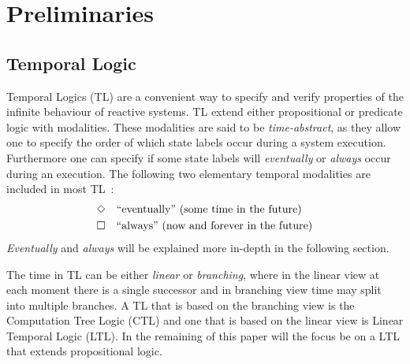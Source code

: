 \section{Preliminaries}\label{sec:preliminaries}

\subsection{Temporal Logic}
Temporal Logics (TL) are a convenient way to specify and verify properties of the infinite behaviour of reactive systems. TL extend either propositional or predicate logic with modalities. These modalities are said to be \emph{time-abstract}, as they allow one to specify the order of which state labels occur during a system execution. Furthermore one can specify if some state labels will \emph{eventually} or \emph{always} occur during an execution. The following two elementary temporal modalities are included in most TL~\cite{baier2008principles}:
\begin{align*}
    &\Diamond \quad \text{``eventually'' (some time in the future)}\\
    &\square \quad \text{``always'' (now and forever in the future)}
\end{align*}
\emph{Eventually} and \emph{always} will be explained more in-depth in the following section. 

The time in TL can be either \emph{linear} or \emph{branching}, where in the linear view at each moment there is a single successor and in branching view time may split into multiple branches. A TL that is based on the branching view is the Computation Tree Logic (CTL) and one that is based on the linear view is Linear Temporal Logic (LTL). In the remaining of this paper will the focus be on a LTL that extends propositional logic.

